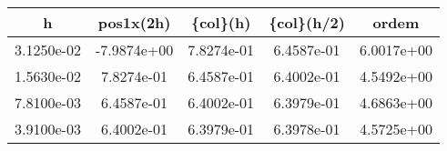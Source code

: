 \begin{table}[htb]
    \centering
    \begin{tabular}{@{}ccccc@{}}
        \toprule
        h & pos1x(2h) & \{col\}(h) & \{col\}(h/2) & ordem \\ \hline
        \midrule
        3.1250e-02 & -7.9874e+00 & 7.8274e-01 & 6.4587e-01 & 6.0017e+00 \\ \hline
        1.5630e-02 & 7.8274e-01 & 6.4587e-01 & 6.4002e-01 & 4.5492e+00 \\ \hline
        7.8100e-03 & 6.4587e-01 & 6.4002e-01 & 6.3979e-01 & 4.6863e+00 \\ \hline
        3.9100e-03 & 6.4002e-01 & 6.3979e-01 & 6.3978e-01 & 4.5725e+00 \\ \hline
        \bottomrule
    \end{tabular}
\end{table}
